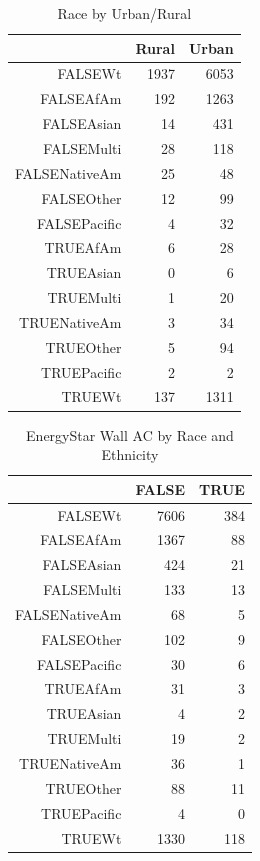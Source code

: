 \documentclass{article}
\begin{document}
  
\begin{table}[ht]
\centering
\begin{tabular}{rrr}
  \hline
 & Rural & Urban \\ 
  \hline
FALSEWt & 1937 & 6053 \\ 
  FALSEAfAm & 192 & 1263 \\ 
  FALSEAsian &  14 & 431 \\ 
  FALSEMulti &  28 & 118 \\ 
  FALSENativeAm &  25 &  48 \\ 
  FALSEOther &  12 &  99 \\ 
  FALSEPacific &   4 &  32 \\ 
  TRUEAfAm &   6 &  28 \\ 
  TRUEAsian &   0 &   6 \\ 
  TRUEMulti &   1 &  20 \\ 
  TRUENativeAm &   3 &  34 \\ 
  TRUEOther &   5 &  94 \\ 
  TRUEPacific &   2 &   2 \\ 
  TRUEWt & 137 & 1311 \\ 
   \hline
\end{tabular}
\caption{Race by Urban/Rural} 
\label{tab:UrbRural}
\end{table}


  
\begin{table}[ht]
\centering
\begin{tabular}{rrr}
  \hline
 & FALSE & TRUE \\ 
  \hline
FALSEWt & 7606 & 384 \\ 
  FALSEAfAm & 1367 &  88 \\ 
  FALSEAsian & 424 &  21 \\ 
  FALSEMulti & 133 &  13 \\ 
  FALSENativeAm &  68 &   5 \\ 
  FALSEOther & 102 &   9 \\ 
  FALSEPacific &  30 &   6 \\ 
  TRUEAfAm &  31 &   3 \\ 
  TRUEAsian &   4 &   2 \\ 
  TRUEMulti &  19 &   2 \\ 
  TRUENativeAm &  36 &   1 \\ 
  TRUEOther &  88 &  11 \\ 
  TRUEPacific &   4 &   0 \\ 
  TRUEWt & 1330 & 118 \\ 
   \hline
\end{tabular}
\caption{EnergyStar Wall AC by Race and Ethnicity} 
\label{tab:EstarWall}
\end{table}
\end{document}

